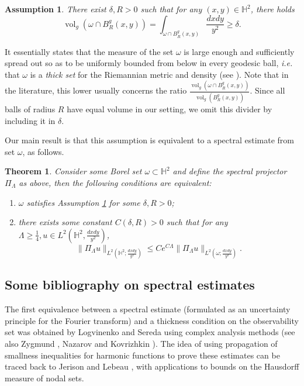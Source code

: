 \documentclass[letterpaper,11pt]{amsart}
\theoremstyle{note}
\newtheorem{theorem}{Theorem}
\newtheorem{assumption}{Assumption}
\numberwithin{equation}{section}
\DeclareMathOperator{\vol}{vol}
\begin{document}
\begin{assumption}
    \label{ass: geodesic balls}
    There exist $\delta, R > 0$ such that for any $(x,y) \in \mathbb{H}^2$, there holds $$\vol_g(\omega \cap B^g_R(x,y)) = \int_{\omega \cap B^g_R(x,y)} \frac{dxdy}{y^2} \geq \delta.$$
\end{assumption}

It essentially states that the measure of the set $\omega$ is large enough and sufficiently spread out so as to be uniformly bounded from below in every geodesic ball, \emph{i.e.} that $\omega$ is a \emph{thick set} for the Riemannian metric and density (see \cite{logvinenkosereda1974equivalent, kovrizhkin2001relatedtoLog-Ser}). Note that in the literature, this lower usually concerns the ratio $\frac{\vol_g(\omega \cap B^g_R(x,y))}{\vol_g(B^g_R(x,y))}$. Since all balls of radius $R$ have equal volume in our setting, we omit this divider by including it in $\delta$.

Our main result is that this assumption is equivalent to a spectral estimate from set $\omega$, as follows.

\begin{theorem}
    \label{theo: main result}
    Consider some Borel set $\omega \subset \mathbb{H}^2$ and define the spectral projector $\Pi_\Lambda$ as above, then the following conditions are equivalent: \begin{enumerate}
        \item $\omega$ satisfies Assumption \ref{ass: geodesic balls} for some $\delta, R > 0$;
        \item there exists some constant $C(\delta, R) > 0$ such that for any $\Lambda \geq \frac{1}{4}, u \in L^2\left(\mathbb{H}^2, \frac{dxdy}{y^2}\right)$, \begin{equation}
        \label{eq: main result estimate}
        \|\Pi_\Lambda u\|_{L^2\left(\mathbb{H}^2;\frac{dxdy}{y^2}\right)} \leq C e^{C\Lambda} \|\Pi_\Lambda u\|_{L^2\left(\omega; \frac{dxdy}{y^2}\right)}.
    \end{equation}
    \end{enumerate}
\end{theorem}

\subsection{Some bibliography on spectral estimates}

The first equivalence between a spectral estimate (formulated as an uncertainty principle for the Fourier transform) and a thickness condition on the observability set was obtained by Logvinenko and Sereda using complex analysis methods \cite{logvinenkosereda1974equivalent} (see also Zygmund \cite[pp.202-208] {zygmund2002trigonometricseries}, Nazarov \cite{nazarov1994local} and Kovrizhkin \cite{kovrizhkin2001relatedtoLog-Ser, kovrizhkin2003uncertainty}). The idea of using propagation of smallness inequalities for harmonic functions to prove these estimates can be traced back to Jerison and Lebeau \cite{jerisonlebeau1999nodal}, with applications to bounds on the Hausdorff measure of nodal sets.
\end{document}
